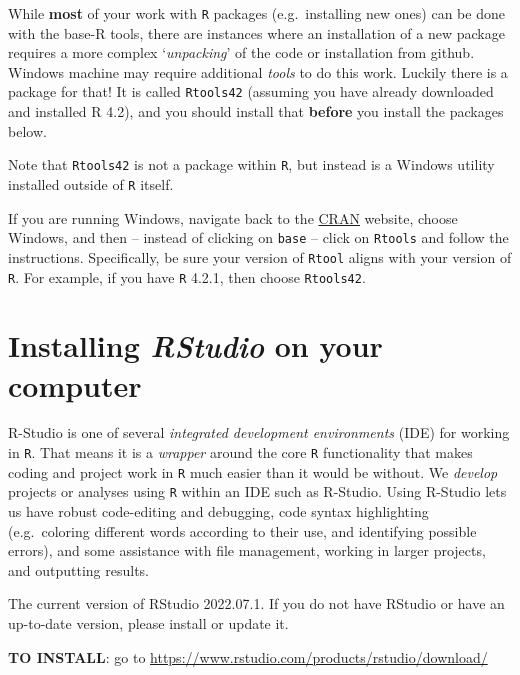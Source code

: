 \documentclass[
]{book}
\begin{document}
While \textbf{most} of your work with \texttt{R} packages (e.g.~installing new ones) can be done with the base-R tools, there are instances where an installation of a new package requires a more complex `\emph{unpacking}' of the code or installation from github. Windows machine may require additional \emph{tools} to do this work. Luckily there is a package for that! It is called \texttt{Rtools42} (assuming you have already downloaded and installed R 4.2), and you should install that \textbf{before} you install the packages below.

Note that \texttt{Rtools42} is not a package within \texttt{R}, but instead is a Windows utility installed outside of \texttt{R} itself.

If you are running Windows, navigate back to the \href{https://cran.r-project.org}{CRAN} website, choose Windows, and then -- instead of clicking on \texttt{base} -- click on \texttt{Rtools} and follow the instructions. Specifically, be sure your version of \texttt{Rtool} aligns with your version of \texttt{R}. For example, if you have \texttt{R} 4.2.1, then choose \texttt{Rtools42}.

\hypertarget{installing-rstudio-on-your-computer}{%
\section*{\texorpdfstring{Installing \emph{RStudio} on your computer}{Installing RStudio on your computer}}\label{installing-rstudio-on-your-computer}}

R-Studio is one of several \emph{integrated development environments} (IDE) for working in \texttt{R}. That means it is a \emph{wrapper} around the core \texttt{R} functionality that makes coding and project work in \texttt{R} much easier than it would be without. We \emph{develop} projects or analyses using \texttt{R} within an IDE such as R-Studio. Using R-Studio lets us have robust code-editing and debugging, code syntax highlighting (e.g.~coloring different words according to their use, and identifying possible errors), and some assistance with file management, working in larger projects, and outputting results.

The current version of RStudio 2022.07.1. If you do not have RStudio or have an up-to-date version, please install or update it.

\textbf{TO INSTALL}: go to \url{https://www.rstudio.com/products/rstudio/download/}
\end{document}
